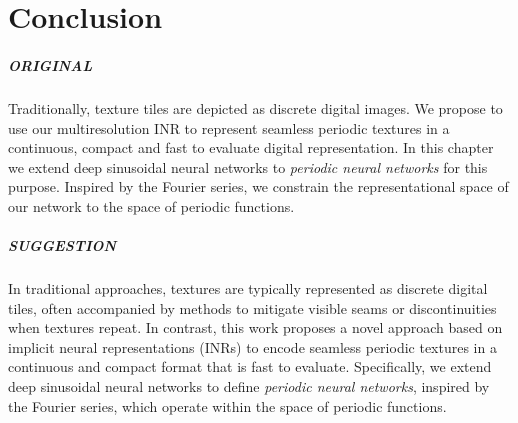 \chapter{Conclusion}




\paragraph{ORIGINAL}
Traditionally, texture tiles are depicted as discrete digital images. We propose to use our multiresolution INR to represent seamless periodic textures in a continuous, compact and fast to evaluate digital representation. In this chapter we extend deep sinusoidal neural networks to \textit{periodic neural networks} for this purpose. Inspired by the Fourier series, we constrain the representational space of our network to the space of periodic functions.

\paragraph{SUGGESTION}
In traditional approaches, textures are typically represented as discrete digital tiles, often accompanied by methods to mitigate visible seams or discontinuities when textures repeat. In contrast, this work proposes a novel approach based on implicit neural representations (INRs) to encode seamless periodic textures in a continuous and compact format that is fast to evaluate. Specifically, we extend deep sinusoidal neural networks to define \textit{periodic neural networks}, inspired by the Fourier series, which operate within the space of periodic functions.


